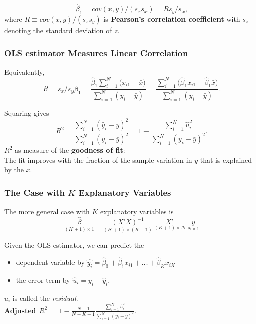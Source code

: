\documentclass[a4paper,12pt]{article}
\def\emph{\textit}
\begin{document}
$$\hat{\beta}_1=cov(x,y)/(s_xs_x)=Rs_y/s_x,$$
where $R\equiv cov(x,y)/(s_xs_y)$ is \textbf{Pearson's correlation coefficient} with $s_z$ denoting the standard deviation of $z$.




\subsubsection*{OLS estimator Measures Linear Correlation}

Equivalently,
$$R=s_x/s_y \hat{\beta}_1= \frac{\hat{\beta}_1\sum^{N}_{i=1}{(x_{i1}-\bar{x}})}{\sum^{N}_{i=1}{(y_{i}-\bar{y})}}=\frac{\sum^{N}_{i=1}{(\hat{\beta}_1x_{i1}-\hat{\beta}_1\bar{x}})}{\sum^{N}_{i=1}{(y_{i}-\bar{y})}}.$$

Squaring gives
$$R^2 =\frac{\sum^{N}_{i=1}{(\hat{y}_{i}-\bar{y})^2}}{\sum^{N}_{i=1}{(y_{i}-\bar{y})^2}}=1 - \frac{\sum^{N}_{i=1}{\hat{u}^2_{i}}}{\sum^{N}_{i=1}{(y_{i}-\bar{y})^2}}.$$
$R^2$ as measure of the \textbf{goodness of fit}:\\The fit improves with the fraction of the sample variation in $y$ that is explained by the $x$.


\subsubsection*{The Case with $K$ Explanatory Variables}




    The more general case with $K$ explanatory variables is
    $$\underset{(K+1) \times 1}{\hat{\beta}}=\underset{(K+1) \times (K+1)}{(X'X)^{-1}}\;\underset{(K+1) \times N}{X'}\;\underset{N \times 1}{y}$$


Given the OLS estimator, we can predict the
\begin{itemize}
	\item dependent variable by $\hat{y_i} = \hat{\beta}_0 + \hat{\beta}_1x_{i1} + \ldots + \hat{\beta}_K x_{iK}$
	\item the error term by $\hat{u}_i = y_i - \hat{y}_i$.
\end{itemize}
  $\hat{u}_i$ is called the \emph{residual}.\\[2ex]

\textbf{Adjusted $R^2$} $= 1 - \frac{N-1}{N-K-1}\frac{\sum^{N}_{i=1}{\hat{u}^2_{i}}}{\sum^{N}_{i=1}{(y_{i}-\bar{y})^2}}.$
\end{document}
